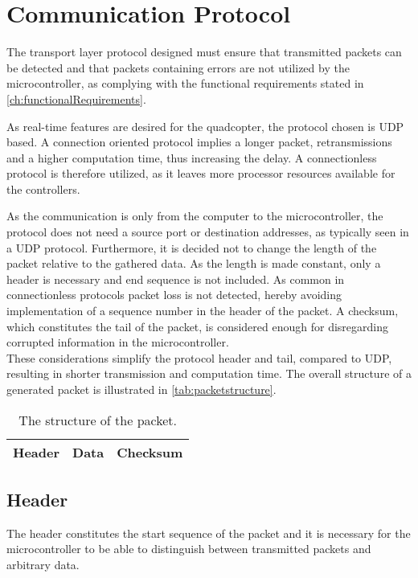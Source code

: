 \section{Communication Protocol}
The transport layer protocol designed must ensure that transmitted packets can be detected and that packets containing errors are not utilized by the microcontroller, as complying with the functional requirements stated in \autoref{ch:functionalRequirements}.

As real-time features are desired for the quadcopter, the protocol chosen is UDP based. A connection oriented protocol implies a longer packet, retransmissions and a higher computation time, thus increasing the delay. A connectionless protocol is therefore utilized, as it leaves more processor resources available for the controllers.

As the communication is only from the computer to the microcontroller, the protocol does not need a source port or destination addresses, as typically seen in a UDP protocol. Furthermore, it is decided not to change the length of the packet relative to the gathered data. As the length is made constant, only a header is necessary and end sequence is not included. As common in connectionless protocols packet loss is not detected, hereby avoiding implementation of a sequence number in the header of the packet. A checksum, which constitutes the tail of the packet, is considered enough for disregarding corrupted information in the microcontroller.\\
These considerations simplify the protocol header and tail, compared to UDP, resulting in shorter transmission and computation time. The overall structure of a generated packet is illustrated in \autoref{tab:packetstructure}.
\vspace{-0.2 cm}
\begin{table}[H]\centering
\begin{tabular}{|>{\centering\arraybackslash}m{3cm}|>{\centering\arraybackslash}m{2cm}|>{\centering\arraybackslash}m{2cm}|}
\hline
Header & Data & Checksum \\
\hline
\end{tabular}
\caption{The structure of the packet.}
\label{tab:packetstructure}
\end{table}
\vspace{-0.5 cm}
\subsection{Header}
The header constitutes the start sequence of the packet and it is necessary for the microcontroller to be able to distinguish between transmitted packets and arbitrary data. 
 

